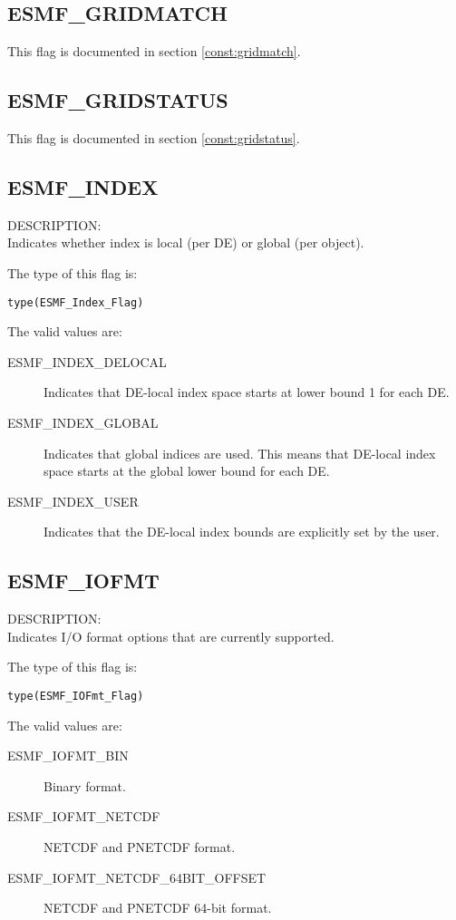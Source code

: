 \subsection{ESMF\_GRIDMATCH}
This flag is documented in section \ref{const:gridmatch}.

\subsection{ESMF\_GRIDSTATUS}
This flag is documented in section \ref{const:gridstatus}.

\subsection{ESMF\_INDEX}
\label{const:indexflag}
{\sf DESCRIPTION:\\}
Indicates whether index is local (per DE) or global (per object).

The type of this flag is:

{\tt type(ESMF\_Index\_Flag)}

The valid values are:
\begin{description}
\item [ESMF\_INDEX\_DELOCAL]
      Indicates that DE-local index space starts at lower bound 1 for each DE.
\item [ESMF\_INDEX\_GLOBAL]
      Indicates that global indices are used. This means that DE-local index
      space starts at the global lower bound for each DE.
\item [ESMF\_INDEX\_USER]
      Indicates that the DE-local index bounds are explicitly set by the user.
 \end{description}

\subsection{ESMF\_IOFMT}
\label{opt:iofmtflag}
{\sf DESCRIPTION:\\}
Indicates I/O format options that are currently supported.

The type of this flag is:

{\tt type(ESMF\_IOFmt\_Flag)}

The valid values are:
\begin{description}
\item [ESMF\_IOFMT\_BIN]
      Binary format.
\item [ESMF\_IOFMT\_NETCDF]
      NETCDF and PNETCDF format.
\item [ESMF\_IOFMT\_NETCDF\_64BIT\_OFFSET]
      NETCDF and PNETCDF 64-bit format.
\end{description}

